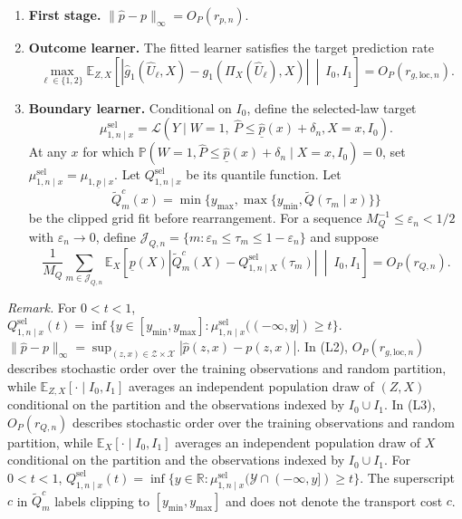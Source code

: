 \begin{assumption}\label{asp:continuous_learners}
\begin{enumerate}[label=(L\arabic*),leftmargin=2.8em,itemsep=0.35em,topsep=0.35em,parsep=0pt]
    \item \textbf{First stage.}
    $\|\hat p-p\|_\infty=O_P(r_{p,n})$.

    \item \textbf{Outcome learner.} The fitted learner satisfies the target prediction rate
    \[
        \max_{\ell\in\{1,2\}}
        \mathbb E_{Z,X}\!\left[
          \left|\hat g_1(\hat U_\ell,X)
          -g_1\!\left(\Pi_X(\hat U_\ell),X\right)\right|
          \ \middle|\ I_0,I_1
        \right]
        =O_P(r_{g,\mathrm{loc},n}).
    \]

    \item \textbf{Boundary learner.} Conditional on $I_0$, define the selected-law target
    \[
        \mu^{\mathrm{sel}}_{1,n\mid x}
        =\mathcal L\!\left(
          Y\mid W=1,\ \hat P\le\hat{\underline p}(x)+\delta_n,
          X=x,I_0\right).
    \]
    At any $x$ for which
    $\mathbb P(W=1,\hat P\le\hat{\underline p}(x)+\delta_n\mid X=x,I_0)=0$,
    set $\mu^{\mathrm{sel}}_{1,n\mid x}=\mu_{1,\underline p\mid x}$.
    Let $Q^{\mathrm{sel}}_{1,n\mid x}$ be its quantile function. Let
    \[
        \widetilde Q_m^c(x)
        =\min\{y_{\max},\max\{y_{\min},
          \widetilde Q(\tau_m\mid x)\}\}
    \]
    be the clipped grid fit before rearrangement. For a sequence
    $M_Q^{-1}\le\varepsilon_n<1/2$ with $\varepsilon_n\to0$, define
    $\mathcal J_{Q,n}=\{m:\varepsilon_n\le\tau_m\le1-\varepsilon_n\}$ and suppose
    \[
        \frac1{M_Q}\sum_{m\in\mathcal J_{Q,n}}
        \mathbb E_X\!\left[
            \underline p(X)
            |\widetilde Q_m^c(X)-Q^{\mathrm{sel}}_{1,n\mid X}(\tau_m)|
            \ \middle|\ I_0,I_1
        \right]
        =O_P(r_{Q,n}).
    \]
\end{enumerate}
\end{assumption}

\noindent\textit{Remark.} For $0<t<1$, $Q^{\mathrm{sel}}_{1,n\mid x}(t)=\inf\{y\in[y_{\min},y_{\max}]:\mu^{\mathrm{sel}}_{1,n\mid x}(( -\infty,y])\geqslant t\}$. $\|\hat p-p\|_\infty=\sup_{(z,x)\in\mathcal Z\times\mathcal X}|\hat p(z,x)-p(z,x)|$. In (L2), $O_P(r_{g,\mathrm{loc},n})$ describes stochastic order over the training observations and random partition, while $\mathbb E_{Z,X}[\cdot\mid I_0,I_1]$ averages an independent population draw of $(Z,X)$ conditional on the partition and the observations indexed by $I_0\cup I_1$. In (L3), $O_P(r_{Q,n})$ describes stochastic order over the training observations and random partition, while $\mathbb E_X[\cdot\mid I_0,I_1]$ averages an independent population draw of $X$ conditional on the partition and the observations indexed by $I_0\cup I_1$. For $0<t<1$, $Q^{\mathrm{sel}}_{1,n\mid x}(t)=\inf\{y\in\mathbb R:\mu^{\mathrm{sel}}_{1,n\mid x}(\mathcal Y\cap(-\infty,y])\geqslant t\}$. The superscript $c$ in $\widetilde Q_m^c$ labels clipping to $[y_{\min},y_{\max}]$ and does not denote the transport cost $c$.

